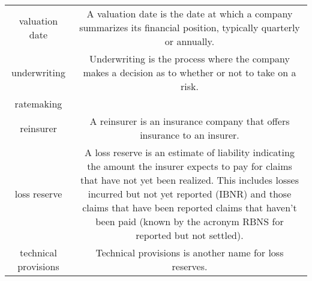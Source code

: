 \documentclass[]{book}
\theoremstyle{definition}
\theoremstyle{definition}
\theoremstyle{definition}
\theoremstyle{remark}
\begin{document}
\begin{longtable}[]{@{}cc@{}}
\begin{minipage}[t]{0.39\columnwidth}
valuation date\strut
\end{minipage} & \begin{minipage}[t]{0.42\columnwidth}\centering\strut
A valuation date is the date at which a company summarizes its financial
position, typically quarterly or annually.\strut
\end{minipage}\tabularnewline
\begin{minipage}[t]{0.39\columnwidth}\centering\strut
underwriting\strut
\end{minipage} & \begin{minipage}[t]{0.42\columnwidth}\centering\strut
Underwriting is the process where the company makes a decision as to
whether or not to take on a risk.\strut
\end{minipage}\tabularnewline
\begin{minipage}[t]{0.39\columnwidth}\centering\strut
ratemaking\strut
\end{minipage} & \begin{minipage}[t]{0.42\columnwidth}\centering\strut
\strut
\end{minipage}\tabularnewline
\begin{minipage}[t]{0.39\columnwidth}\centering\strut
reinsurer\strut
\end{minipage} & \begin{minipage}[t]{0.42\columnwidth}\centering\strut
A reinsurer is an insurance company that offers insurance to an
insurer.\strut
\end{minipage}\tabularnewline
\begin{minipage}[t]{0.39\columnwidth}\centering\strut
loss reserve\strut
\end{minipage} & \begin{minipage}[t]{0.42\columnwidth}\centering\strut
A loss reserve is an estimate of liability indicating the amount the
insurer expects to pay for claims that have not yet been realized. This
includes losses incurred but not yet reported (IBNR) and those claims
that have been reported claims that haven't been paid (known by the
acronym RBNS for reported but not settled).\strut
\end{minipage}\tabularnewline
\begin{minipage}[t]{0.39\columnwidth}\centering\strut
technical provisions\strut
\end{minipage} & \begin{minipage}[t]{0.42\columnwidth}\centering\strut
Technical provisions is another name for loss reserves.\strut
\end{minipage}\tabularnewline

\end{longtable}
\end{document}
